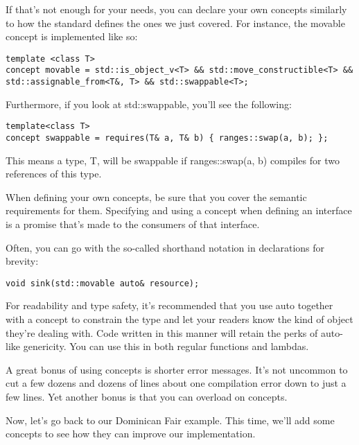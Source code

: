 If that's not enough for your needs, you can declare your own concepts similarly to how the standard defines the ones we just covered. For instance, the movable concept is implemented like so:

\begin{lstlisting}[style=styleCXX]
template <class T>
concept movable = std::is_object_v<T> && std::move_constructible<T> &&
std::assignable_from<T&, T> && std::swappable<T>;
\end{lstlisting}

Furthermore, if you look at std::swappable, you'll see the following:

\begin{lstlisting}[style=styleCXX]
template<class T>
concept swappable = requires(T& a, T& b) { ranges::swap(a, b); };
\end{lstlisting}

This means a type, T, will be swappable if ranges::swap(a, b) compiles for two references of this type.

\begin{tcolorbox}[colback=webgreen!5!white,colframe=webgreen!75!black, title=TIP]
\hspace*{0.7cm}When defining your own concepts, be sure that you cover the semantic requirements for them. Specifying and using a concept when defining an interface is a promise that's made to the consumers of that interface.
\end{tcolorbox}

Often, you can go with the so-called shorthand notation in declarations for brevity:

\begin{lstlisting}[style=styleCXX]
void sink(std::movable auto& resource);
\end{lstlisting}

For readability and type safety, it's recommended that you use auto together with a concept to constrain the type and let your readers know the kind of object they're dealing with. Code written in this manner will retain the perks of auto-like genericity. You can use this in both regular functions and lambdas.

A great bonus of using concepts is shorter error messages. It's not uncommon to cut a few dozens and dozens of lines about one compilation error down to just a few lines. Yet another bonus is that you can overload on concepts.

Now, let's go back to our Dominican Fair example. This time, we'll add some concepts to see how they can improve our implementation.


